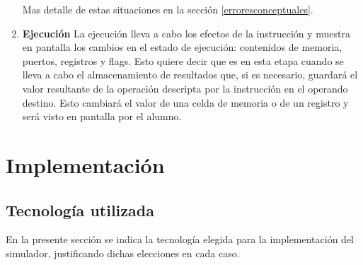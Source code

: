 \begin{enumerate}
Mas detalle de estas situaciones en la sección \ref{erroresconceptuales}.

\item  \textbf{Ejecución}
La ejecución lleva a cabo los efectos de la instrucción y muestra en pantalla los cambios en el estado de ejecución: contenidos de memoria, puertos, registros y flags. Esto quiere decir que es en esta etapa cuando se lleva a cabo el almacenamiento de resultados que, si es necesario, guardará el valor resultante de la operación descripta por la instrucción en el operando destino. Esto cambiará el valor de una celda de memoria o de un registro y será visto en pantalla por el alumno.
\end{enumerate}


\section{Implementación}

\subsection{Tecnología utilizada}
En la presente sección se indica la tecnología elegida para la implementación del simulador, justificando dichas elecciones en cada caso.


